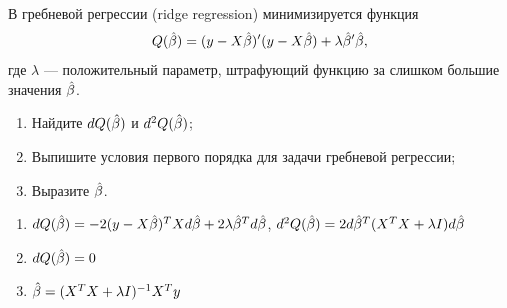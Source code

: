 \begin{problem}
В гребневой регрессии (ridge regression) минимизируется функция
\[
Q(\hat{\beta}) = (y - X\hat{\beta})'(y - X\hat{\beta}) + \lambda \hat{\beta}' \hat{\beta},
\]
где $\lambda$ — положительный параметр, штрафующий функцию за слишком большие значения $\hat{\beta}$.

\begin{enumerate}
\item Найдите $dQ(\hat{\beta})$ и $d^2Q(\hat{\beta})$;
\item Выпишите условия первого порядка для задачи гребневой регрессии;
\item Выразите $\hat{\beta}$.
\end{enumerate}

\begin{sol}
\begin{enumerate}
\item $dQ(\hat{\beta}) = -2(y-X\hat{\beta})^T X d\hat{\beta} + 2\lambda \hat{\beta}^T d\hat{\beta}$, $d^2Q(\hat{\beta})=2d\hat{\beta}^T(X^T X + \lambda I) d\hat{\beta}$
\item $dQ(\hat{\beta}) = 0$
\item $\hat{\beta} = (X^T X + \lambda I)^{-1} X^T y$
\end{enumerate}
\end{sol}
\end{problem}



